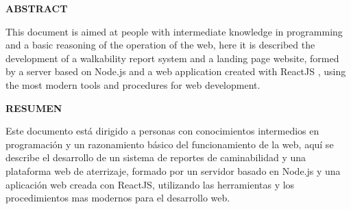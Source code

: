 \begin{center}
  {\Large \bf{ABSTRACT}}
\end{center}
This document is aimed at people with intermediate knowledge in programming and a basic reasoning of the operation of the web, here it is described the development of a walkability report system and a landing page website, formed by a server based on Node.js and a web application created with ReactJS , using the most modern tools and procedures for web development.
\vspace{0.8cm}


\newpage
\begin{center}
  {\Large \bf{RESUMEN}}
\end{center}
Este documento está dirigido a personas con conocimientos intermedios en programación y un razonamiento básico del funcionamiento de la web, aquí se describe el desarrollo de un sistema de reportes de caminabilidad y una plataforma web de aterrizaje, formado por un servidor basado en Node.js y una aplicación web creada con ReactJS, utilizando las herramientas y los procedimientos mas modernos para el desarrollo web. 
\vspace{0.8cm}